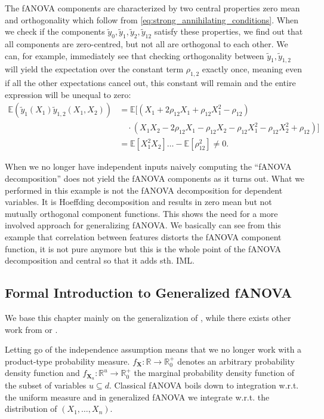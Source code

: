 The fANOVA components are characterized by two central properties zero mean and orthogonality which follow from \autoref{eq:strong_annihilating_conditions}.
When we check if the components $\tilde{y}_0, \tilde{y}_1, \tilde{y}_2, \tilde{y}_{12}$ satisfy these properties, we find out that all components are zero-centred, but not all are orthogonal to each other. We can, for example, immediately see that checking orthogonality between $\tilde{y}_{1}, \tilde{y}_{1,2}$ will yield the expectation over the constant term $\rho_{1,2}$ exactly once, meaning even if all the other expectations cancel out, this constant will remain and the entire expression will be unequal to zero:
\begin{align*}
    \mathbb{E}(\tilde{y}_1(X_1)\tilde{y}_{1,2}(X_1, X_2)) 
    &= \mathbb{E}[(X_1 + 2\rho_{12}X_1 + \rho_{12}X_1^2 - \rho_{12}) \\
    &\quad \cdot (X_1 X_2 - 2\rho_{12} X_1 - \rho_{12} X_2 - \rho_{12} X_1^2 - \rho_{12} X_2^2 + \rho_{12})] \\
    &= \mathbb{E}[X_{1}^2X_2] \ldots - \mathbb{E}[\rho_{12}^2] \neq 0.
\end{align*}

When we no longer have independent inputs naively computing the ``fANOVA decomposition'' does not yield the fANOVA components as it turns out. What we performed in this example is not the fANOVA decomposition for dependent variables. It is Hoeffding decomposition \citep{hoeffding1948} and results in zero mean but not mutually orthogonal component functions. This shows the need for a more involved approach for generalizing fANOVA.
We basically can see from this example that correlation between features distorts the fANOVA component function, it is not pure anymore but this is the whole point of the fANOVA decomposition and central so that it adds sth. IML.

\subsection{Formal Introduction to Generalized fANOVA}
We base this chapter mainly on the generalization of \cite{rahman2014}, while there exists other work from \cite{hooker2007} or \cite{chastaing2012}.\par

Letting go of the independence assumption means that we no longer work with a product-type probability measure. $f_{\boldsymbol{X}}: \mathbb{R} \rightarrow \mathbb{R}_{0}^{+}$ denotes an arbitrary probability density function and $f_{\boldsymbol{X}_u}: \mathbb{R}^u \rightarrow \mathbb{R}_{0}^{+}$ the marginal probability density function of the subset of variables $u \subseteq d$. Classical fANOVA boils down to integration w.r.t. the uniform measure and in generalized fANOVA we integrate w.r.t. the distribution of $(X_1, \dots, X_n)$.\par

